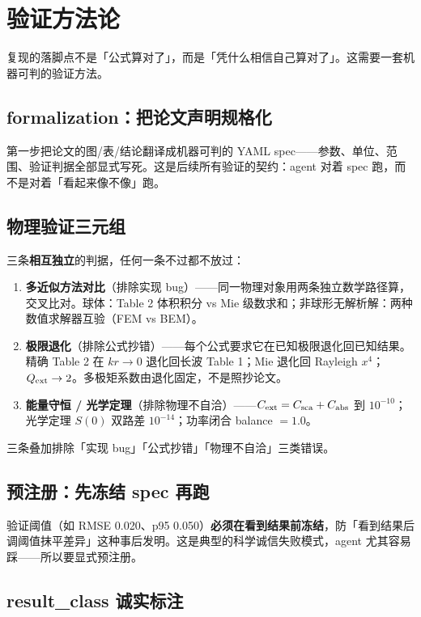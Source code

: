 \section{验证方法论}

复现的落脚点不是「公式算对了」，而是「凭什么相信自己算对了」。这需要一套机器可判的验证方法。

\subsection{formalization：把论文声明规格化}

第一步把论文的图/表/结论翻译成机器可判的 YAML spec——参数、单位、范围、验证判据全部显式写死。这是后续所有验证的契约：agent 对着 spec 跑，而不是对着「看起来像不像」跑。

\subsection{物理验证三元组}

三条\textbf{相互独立}的判据，任何一条不过都不放过：

\begin{enumerate}
  \item \textbf{多近似方法对比}（排除实现 bug）——同一物理对象用两条独立数学路径算，交叉比对。球体：Table 2 体积积分 vs Mie 级数求和；非球形无解析解：两种数值求解器互验（FEM vs BEM）。
  \item \textbf{极限退化}（排除公式抄错）——每个公式要求它在已知极限退化回已知结果。精确 Table 2 在 $kr\to0$ 退化回长波 Table 1；Mie 退化回 Rayleigh $x^4$；$Q_{\rm ext}\to2$。多极矩系数由退化固定，不是照抄论文。
  \item \textbf{能量守恒 / 光学定理}（排除物理不自洽）——$C_{\rm ext}=C_{\rm sca}+C_{\rm abs}$ 到 $10^{-10}$；光学定理 $S(0)$ 双路差 $10^{-14}$；功率闭合 balance $=1.0$。
\end{enumerate}

三条叠加排除「实现 bug」「公式抄错」「物理不自洽」三类错误。

\subsection{预注册：先冻结 spec 再跑}

验证阈值（如 RMSE 0.020、p95 0.050）\textbf{必须在看到结果前冻结}，防「看到结果后调阈值抹平差异」这种事后发明。这是典型的科学诚信失败模式，agent 尤其容易踩——所以要显式预注册。

\subsection{result\_class 诚实标注}

